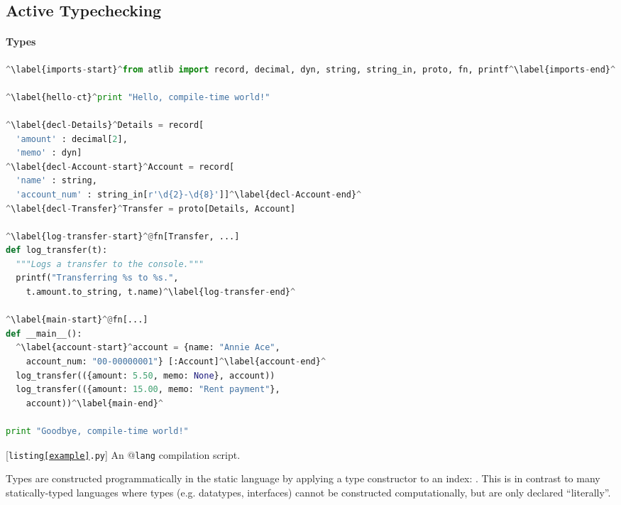 \subsection{Active Typechecking} 

\paragraph{Types}
\begin{codelisting}[t]
\begin{lstlisting}[language=Python]
^\label{imports-start}^from atlib import record, decimal, dyn, string, string_in, proto, fn, printf^\label{imports-end}^

^\label{hello-ct}^print "Hello, compile-time world!"

^\label{decl-Details}^Details = record[
  'amount' : decimal[2], 
  'memo' : dyn]
^\label{decl-Account-start}^Account = record[
  'name' : string, 
  'account_num' : string_in[r'\d{2}-\d{8}']]^\label{decl-Account-end}^
^\label{decl-Transfer}^Transfer = proto[Details, Account]

^\label{log-transfer-start}^@fn[Transfer, ...]
def log_transfer(t):
  """Logs a transfer to the console."""
  printf("Transferring %s to %s.", 
    t.amount.to_string, t.name)^\label{log-transfer-end}^

^\label{main-start}^@fn[...]
def __main__():
  ^\label{account-start}^account = {name: "Annie Ace", 
    account_num: "00-00000001"} [:Account]^\label{account-end}^
  log_transfer(({amount: 5.50, memo: None}, account))
  log_transfer(({amount: 15.00, memo: "Rent payment"}, 
    account))^\label{main-end}^
  
print "Goodbye, compile-time world!"
\end{lstlisting}
\caption{[\texttt{listing\ref{example}.py}] An @\texttt{lang} compilation script.}
\label{example}
\end{codelisting}
Types are constructed programmatically in the static language by applying a type constructor to an index:  . This is in contrast to many statically-typed languages where types (e.g. datatypes, interfaces) cannot be constructed computationally, but are only declared ``literally''. %

